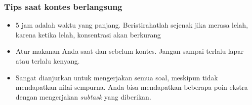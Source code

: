 \begin{frame}
	\frametitle{Tips saat kontes berlangsung}
	\begin{itemize}
		\item 5 jam adalah waktu yang panjang. Beristirahatlah sejenak jika merasa lelah, karena ketika lelah, konsentrasi akan berkurang
		\item Atur makanan Anda saat dan sebelum kontes. Jangan sampai terlalu lapar atau terlalu kenyang.
		\item Sangat dianjurkan untuk mengerjakan semua soal, meskipun tidak mendapatkan nilai sempurna. Anda bisa mendapatkan beberapa poin ekstra dengan mengerjakan \textit{subtask} yang diberikan.
	\end{itemize}
	
\end{frame}



